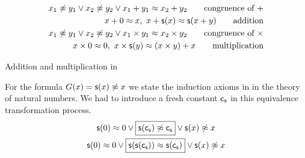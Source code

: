 \begin{table}[hbt]	
	\begin{align*}
		x_1\mNE y_1\lor x_2\mNE y_2\lor x_1+y_1 \mEQ x_2+y_2
		\tag*{congruence of $+$}
		\\
		x + 0 \mEQ x,\ 
		x+\msucc(x) \mEQ \msucc(x+y)
		\tag*{addition}
		\\
		x_1\mNE y_1\lor x_2\mNE y_2\lor x_1\times y_1 \mEQ x_2\times y_2
		\tag*{congruence of $\times$}
		\\
		x \times 0 \mEQ 0,\ 
		x \times\msucc(y) \mEQ (x\times y) + x
		\tag*{multiplication}
	\end{align*}
	\caption{Addition and multiplication in \CNF}
	\label{tab:addition:multiplication}
\end{table}

\begin{example} For the formula $G(x)={\mathsf s}(x)\not\approx x$ we state the induction axioms in \CNF in the theory of natural numbers.
	We had to introduce a fresh constant ${\mathsf c}_{{\mathsf s}}$ in this equivalence transformation process.
	\begin{gather*}
	{\mathsf s}(0)\approx 0 \lor \boxed{{\mathsf s}({\mathsf c}_{{\mathsf s}})\not\approx {\mathsf c}_{{\mathsf s}}} \lor {\mathsf s}(x)\not\approx x \\
	{\mathsf s}(0)\approx 0 \lor \boxed{{\mathsf s}({\mathsf s}({\mathsf c}_{{\mathsf s}}))\approx {\mathsf s}({\mathsf c}_{{\mathsf s}})} \lor {\mathsf s}(x)\not\approx x
	\end{gather*}
\end{example}


